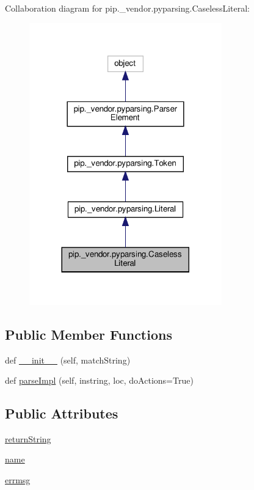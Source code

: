 Collaboration diagram for pip.\+\_\+vendor.\+pyparsing.\+Caseless\+Literal\+:
\nopagebreak
\begin{figure}[H]
\begin{center}
\leavevmode
\includegraphics[width=236pt]{classpip_1_1__vendor_1_1pyparsing_1_1CaselessLiteral__coll__graph}
\end{center}
\end{figure}
\subsection*{Public Member Functions}
\begin{DoxyCompactItemize}
\item 
def \hyperlink{classpip_1_1__vendor_1_1pyparsing_1_1CaselessLiteral_a66c495156307975cc5394c6df7771d9b}{\+\_\+\+\_\+init\+\_\+\+\_\+} (self, match\+String)
\item 
def \hyperlink{classpip_1_1__vendor_1_1pyparsing_1_1CaselessLiteral_a77c342490006ea06ae9650e9479812cd}{parse\+Impl} (self, instring, loc, do\+Actions=True)
\end{DoxyCompactItemize}
\subsection*{Public Attributes}
\begin{DoxyCompactItemize}
\item 
\hyperlink{classpip_1_1__vendor_1_1pyparsing_1_1CaselessLiteral_ac98d2f6141887435074d18ae8f1984cf}{return\+String}
\item 
\hyperlink{classpip_1_1__vendor_1_1pyparsing_1_1CaselessLiteral_af71d9027808b85a4fdcc868967d1035d}{name}
\item 
\hyperlink{classpip_1_1__vendor_1_1pyparsing_1_1CaselessLiteral_a636d275e023af2ddca397d7595c8166f}{errmsg}
\end{DoxyCompactItemize}
